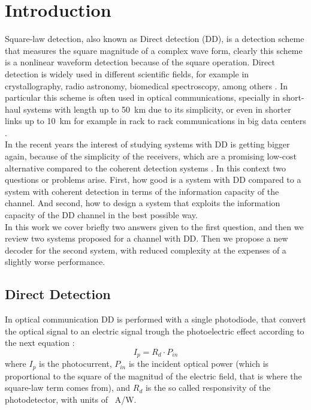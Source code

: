 \chapter{Introduction}
\label{ch:introduction}
\newcommand{\IntroImage}[1]{images/intro/#1}


	

Square-law detection, also known as Direct detection (DD), is a detection scheme that measures the square magnitude of a complex wave form, clearly this scheme is a nonlinear waveform detection because of the square operation. Direct detection is widely used in different scientific fields, for example in crystallography, radio astronomy, biomedical spectroscopy, among others \cite{Tasbihi_Tukey}. In particular this scheme is often used in optical communications, specially in short-haul systems with length up to \SI{50}{\km} \cite{Agrawal_ch1} due to its simplicity, or even in shorter links up to \SI{10}{\km} for example in rack to rack communications in big data centers \cite{Tasbihi_Tukey}.\\


In the recent years the interest of studying systems with DD is getting bigger again, because of the simplicity of the receivers, which are a promising low-cost alternative compared to the coherent detection systems \cite{Mecozzi_2018}. In this context two questions or problems arise. First, how good is a system with DD compared to a system with coherent detection in terms of the information capacity of the channel. And second, how to design a system that exploits the information capacity of the DD channel in the best possible way.\\

In this work we cover briefly two answers given to the first question, and then we review two systems proposed for a channel with DD. Then we propose a new decoder for the second system, with reduced complexity at the expenses of a slightly worse performance.




\section{Direct Detection}
\label{sec:Direct_Detection}

In optical communication DD is performed with a single photodiode, that convert the optical signal to an electric signal trough the photoelectric effect according to the next equation \cite{Agrawal_ch4}:
\begin{equation}
I_p = R_d\cdot P_{in}
\label{eq:photocurrent}
\end{equation}
where $I_p$ is the photocurrent, $P_{in}$ is the incident optical power (which is proportional to the square of the magnitud of the electric field, that is where the square-law term comes from), and $R_d$ is the so called responsivity of the photodetector, with units of \SI{}{\A/\W}.\\

